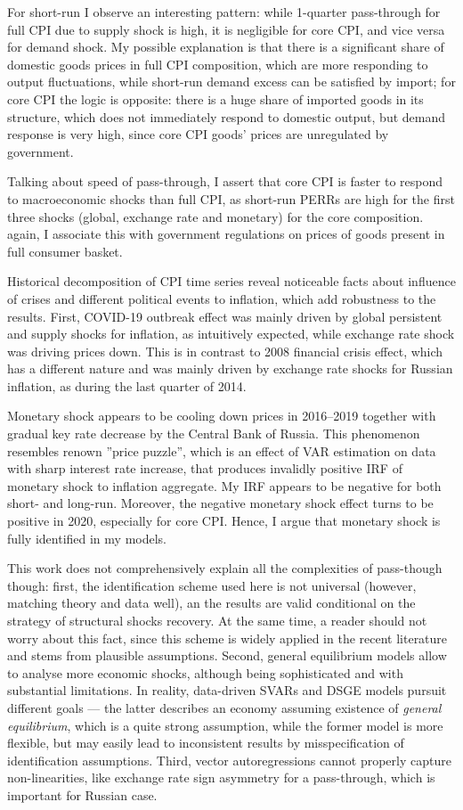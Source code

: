 \documentclass[12pt, a4paper]{extarticle}
\begin{document}
For short-run I observe an interesting pattern: while 1-quarter pass-through for full CPI due to supply shock is high, it is negligible for core CPI, and vice versa for demand shock. My possible explanation is that there is a significant share of domestic goods prices in full CPI composition, which are more responding to output fluctuations, while short-run demand excess can be satisfied by import; for core CPI the logic is opposite: there is a huge share of imported goods in its structure, which does not immediately respond to domestic output, but demand response is very high, since core CPI goods' prices are unregulated by government.

Talking about speed of pass-through, I assert that core CPI is faster to respond to macroeconomic shocks than full CPI, as short-run PERRs are high for the first three shocks (global, exchange rate and monetary) for the core composition. again, I associate this with government regulations on prices of goods present in full consumer basket. 

Historical decomposition of CPI time series reveal noticeable facts about influence of crises and different political events to inflation, which add robustness to the results. First, COVID-19 outbreak effect was mainly driven by global persistent and supply shocks for inflation, as intuitively expected, while exchange rate shock was driving prices down. This is in contrast to 2008 financial crisis effect, which has a different nature and was mainly driven by exchange rate shocks for Russian inflation, as during the last quarter of 2014.

Monetary shock appears to be cooling down prices in 2016--2019 together with gradual key rate decrease by the Central Bank of Russia. This phenomenon resembles renown ''price puzzle'', which is an effect of VAR estimation on data with sharp interest rate increase, that produces invalidly positive IRF of monetary shock to inflation aggregate. My IRF appears to be negative for both short- and long-run. Moreover, the negative monetary shock effect turns to be positive in 2020, especially for core CPI. Hence, I argue that monetary shock is fully identified in my models.

This work does not comprehensively explain all the complexities of pass-though though: first, the identification scheme used here is not universal (however, matching theory and data well), an the results are valid conditional on the strategy of structural shocks recovery. At the same time, a reader should not worry about this fact, since this scheme is widely applied in the recent literature and stems from plausible assumptions. Second, general equilibrium models allow to analyse more economic shocks, although being sophisticated and with substantial limitations. In reality, data-driven SVARs and DSGE models pursuit different goals --- the latter describes an economy assuming existence of \textit{general equilibrium}, which is a quite strong assumption, while the former model is more flexible, but may easily lead to inconsistent results by misspecification of identification assumptions. Third, vector autoregressions cannot properly capture non-linearities, like exchange rate sign asymmetry for a pass-through, which is important for Russian case.
\end{document}
